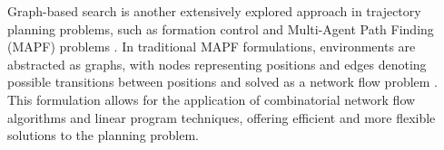 \documentclass[10pt,twocolumn,twoside]{IEEEtran}
\begin{document}
Graph-based search is another extensively explored approach in trajectory planning problems, such as formation control \cite{tanner2004leader,hu2019distributed} and Multi-Agent Path Finding (MAPF) problems \cite{stern2019multi}. In traditional MAPF formulations, environments are abstracted as graphs, with nodes representing positions and edges denoting possible transitions between positions and solved as a network flow problem \cite{yu2013multi,yu2016optimal}. This formulation allows for the application of combinatorial network flow algorithms and linear program techniques, offering efficient and more flexible solutions to the planning problem. %
\end{document}
